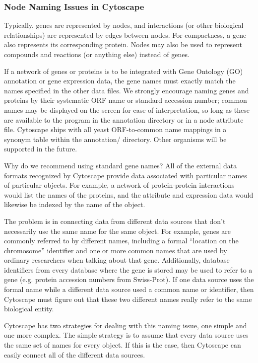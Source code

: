  
\subsubsection*{Node Naming Issues in Cytoscape}


 Typically, genes are represented by nodes, and interactions (or other biological relationships) are represented by edges between nodes. For compactness, a gene also represents its corresponding protein. Nodes may also be used to represent compounds and reactions (or anything else) instead of genes. 


 If a network of genes or proteins is to be integrated with Gene Ontology (GO) annotation or gene expression data, the gene names must exactly match the names specified in the other data files. We strongly encourage naming genes and proteins by their systematic ORF name or standard accession number; common names may be displayed on the screen for ease of interpretation, so long as these are available to the program in the annotation directory or in a node attribute file. Cytoscape ships with all yeast ORF-to-common name mappings in a synonym table within the annotation/ directory. Other organisms will be supported in the future. 


 Why do we recommend using standard gene names? All of the external data formats recognized by Cytoscape provide data associated with particular names of particular objects. For example, a network of protein-protein interactions would list the names of the proteins, and the attribute and expression data would likewise be indexed by the name of the object. 


 The problem is in connecting data from different data sources that don't necessarily use the same name for the same object. For example, genes are commonly referred to by different names, including a formal ``location on the chromosome'' identifier and one or more common names that are used by ordinary researchers when talking about that gene. Additionally, database identifiers from every database where the gene is stored may be used to refer to a gene (e.g. protein accession numbers from Swiss-Prot). If one data source uses the formal name while a different data source used a common name or identifier, then Cytoscape must figure out that these two different names really refer to the same biological entity. 


 Cytoscape has two strategies for dealing with this naming issue, one simple and one more complex. The simple strategy is to assume that every data source uses the same set of names for every object. If this is the case, then Cytoscape can easily connect all of the different data sources. 


